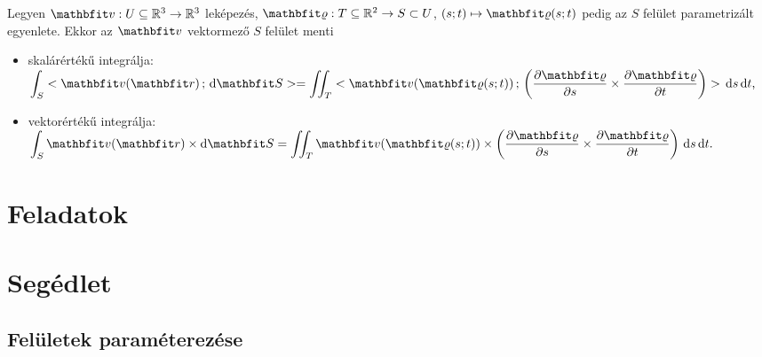 \documentclass[lang=magyar]{math-handout}
\begin{document}
\vfill

\begin{definition}
  Legyen $\rvec v:  U \subseteq \mathbb R^3 \rightarrow \mathbb R^3$ leképezés,
  $\rvec \varrho: T \subseteq \mathbb R^2 \rightarrow S \subset U$, $(s;t)
    \mapsto \rvec \varrho(s;t)$ pedig az $S$ felület parametrizált egyenlete.
  Ekkor az $\rvec v$ vektormező $S$ felület menti
  \begin{itemize}
    \item skalárértékű integrálja:
          \(
            \displaystyle
            \int_S \scalar{\rvec v (\rvec r)}{\diff \rvec S} =
            \iint_T \scalar
            {\rvec v (\rvec \varrho(s; t))}
            {\left(\pdv{\rvec \varrho}{s} \times \pdv{\rvec \varrho}{t}\right)}
            \, \diff s \, \diff t
            \text,
          \)
    \item vektorértékű integrálja:
          \(
            \displaystyle
            \int_S \rvec v (\rvec r) \times \diff \rvec S =
            \iint_T {\rvec v (\rvec \varrho(s; t))} \times
            \left(\pdv{\rvec \varrho}{s} \times \pdv{\rvec \varrho}{t}\right)
            \, \diff s \, \diff t
            \text.
          \)

  \end{itemize}
\end{definition}

\clearpage
\section{Feladatok}

\clearpage
\section{Segédlet}

\subsection{Felületek paraméterezése}
\end{document}
